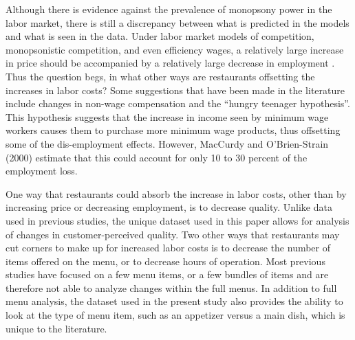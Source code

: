 \documentclass[11pt]{article}
\begin{document}
Although there is evidence against the prevalence of monopsony power in the labor market, there is still a discrepancy between what is predicted in the models and what is seen in the data.  Under labor market models of competition, monopsonistic competition, and even efficiency wages, a relatively large increase in price should be accompanied by a relatively large decrease in employment \cite{aaronson2008minimum}. Thus the question begs, in what other ways are restaurants offsetting the increases in labor costs? Some suggestions that have been made in the literature include changes in non-wage compensation and the ``hungry teenager hypothesis''\cite{kennan1995elusive}. This hypothesis suggests that the increase in income seen by minimum wage workers causes them to purchase more minimum wage products, thus offsetting some of the dis-employment effects. However, MacCurdy and O'Brien-Strain (2000) estimate that this could account for only 10 to 30 percent of the employment loss\nocite{macurdy2000increasing}. 

One way that restaurants could absorb the increase in labor costs, other than by increasing price or decreasing employment, is to decrease quality. Unlike data used in previous studies, the unique dataset used in this paper allows for analysis of changes in customer-perceived quality. Two other ways that restaurants may cut corners to make up for increased labor costs is to decrease the number of items offered on the menu, or to decrease hours of operation. Most previous studies have focused on a few menu items, or a few bundles of items and are therefore not able to analyze changes within the full menus. In addition to full menu analysis, the dataset used in the present study also provides the ability to look at the type of menu item, such as an appetizer versus a main dish, which is unique to the literature. 


\end{document}
